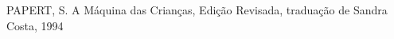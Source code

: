 \documentclass[
12pt,		%
openright,	%
twoside,  %
a4paper,			%
chapter=TITLE,		%
english,			%
french,				%
spanish,			%
brazil				%
]{USPSC-classe/USPSC}
\begin{document}
\begin{flushleft}
\begin{flushleft}
\begin{flushleft}
\begin{flushleft}
\begin{flushleft}
\begin{flushleft}
\begin{flushleft}
\begin{flushleft}
\begin{flushleft}
\begin{flushleft}
[PAPERT, 1994] PAPERT, S. A M\'aquina das Crian\c{c}as, Edi\c{c}\~ao Revisada, tradua\c{c}\~ao de Sandra Costa, 1994
\end{flushleft}


\end{flushleft}


\end{flushleft}


\end{flushleft}


\end{flushleft}


\end{flushleft}


\end{flushleft}


\end{flushleft}


\end{flushleft}


\end{flushleft}
\end{document}
